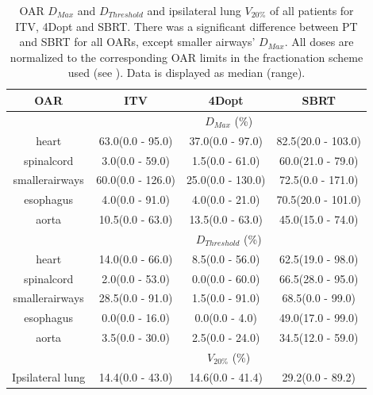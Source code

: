 \documentclass[type=dr, dr=rernat, accentcolor=tud7b,colorbacktitle, bigchapter, openright, twoside, 12pt ]{tudthesis}
\begin{document}
\begin{table}[H]
	\centering
	\caption{OAR $D_{Max}$ and $D_{Threshold}$ and ipsilateral lung $V_{20\%}$ of all patients for ITV, 4Dopt and SBRT. There was a significant difference between PT and SBRT for all OARs, except
	smaller airways' $D_{Max}$. All doses are normalized to the corresponding OAR limits in the fractionation scheme used (see \cite{Benedict2010}). Data is displayed as median (range).}
	\begin{tabular}{c|c|c|c}
		\hline\hline
		 
		OAR &  ITV & 4Dopt & SBRT \\
		\hline
		& \multicolumn{3}{c}{$D_{Max}$ (\%)}  \\
		\hline
heart & 63.0(0.0 - 95.0) & 37.0(0.0 - 97.0) & 82.5(20.0 - 103.0)\\ 
spinalcord & 3.0(0.0 - 59.0) & 1.5(0.0 - 61.0) & 60.0(21.0 - 79.0)\\ 
smallerairways & 60.0(0.0 - 126.0) & 25.0(0.0 - 130.0) & 72.5(0.0 - 171.0)\\ 
esophagus & 4.0(0.0 - 91.0) & 4.0(0.0 - 21.0) & 70.5(20.0 - 101.0)\\ 
aorta & 10.5(0.0 - 63.0) & 13.5(0.0 - 63.0) & 45.0(15.0 - 74.0)\\
\hline\hline
& \multicolumn{3}{c}{$D_{Threshold}$ (\%)} \\
\hline
heart & 14.0(0.0 - 66.0) & 8.5(0.0 - 56.0) & 62.5(19.0 - 98.0)\\ 
spinalcord & 2.0(0.0 - 53.0) & 0.0(0.0 - 60.0) & 66.5(28.0 - 95.0)\\ 
smallerairways & 28.5(0.0 - 91.0) & 1.5(0.0 - 91.0) & 68.5(0.0 - 99.0)\\ 
esophagus & 0.0(0.0 - 16.0) & 0.0(0.0 - 4.0) & 49.0(17.0 - 99.0)\\ 
aorta & 3.5(0.0 - 30.0) & 2.5(0.0 - 24.0) & 34.5(12.0 - 59.0)\\ 
\hline\hline
& \multicolumn{3}{c}{$V_{20\%}$ (\%)} \\
\hline
Ipsilateral lung & 14.4(0.0 - 43.0) & 14.6(0.0 - 41.4) & 29.2(0.0 - 89.2)\\
\hline\hline
	\end{tabular}
	\label{tab:OARComplex}
\end{table}
\end{document}
